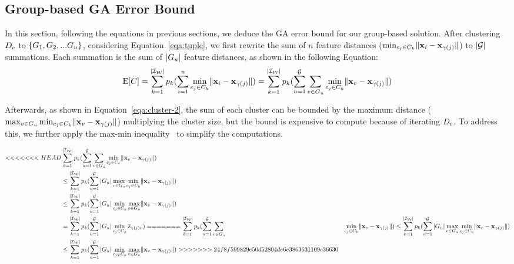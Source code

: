 




\subsection{Group-based GA Error Bound}

In this section, following the equations in previous sections, we deduce the GA error bound for our group-based solution. 
%
After clustering $D_c$ to $\{ G_1 , G_2, ...G_u\}$, considering Equation~\ref{eqa:tuple}, we  first rewrite the sum of $n$ feature distances (\ie $\min_{c_j\in C_k}\lVert\mathbf{x}_i - \mathbf{x}_{\gamma(j)}\rVert$) to   $|\mathcal{G}|$ summations. Each summation is the sum of $|G_u|$ feature distances, as shown in the following Equation:
\vspace{-0.5em}
\begin{equation}\label{eqa:cluster-1}
 \mathrm{E}[C] = \sum_{k= 1}^{|\mathcal{I_W}|} p_k (\sum_{i=1}^n \min_{c_j\in C_k}\lVert\mathbf{x}_i - \mathbf{x}_{\gamma(j)}\rVert) =  \sum_{k= 1}^{|\mathcal{I_W}|} p_k (\sum_{u=1}^{\mathcal{G}}\sum_{v \in G_u} \min_{c_j\in C_k}\lVert\mathbf{x}_v - \mathbf{x}_{\gamma(j)}\rVert)
\end{equation}

Afterwards, as shown in Equation~\ref{eqa:cluster-2},  the sum of each cluster can be bounded by  the maximum distance ($\max_{v \in G_u} \min_{c_j\in C_k}\lVert\mathbf{x}_v - \mathbf{x}_{\gamma(j)}\rVert$)  multiplying the  cluster size, but the bound is expensive to compute because of iterating $D_c$. To address this, we further apply the max-min inequality~\cite{} to simplify the computations. 


\begin{equation}\label{eqa:cluster-2}
\begin{aligned}
<<<<<<< HEAD
&  \sum_{k= 1}^{|\mathcal{I_W}|} p_k (\sum_{u=1}^{\mathcal{G}}\sum_{v \in G_u} \min_{c_j\in C_k}\lVert\mathbf{x}_v - \mathbf{x}_{\gamma(j)}\rVert) \\
& \leq \sum_{k= 1}^{|\mathcal{I_W}|} p_k (\sum_{u=1}^{\mathcal{G}} |G_u| \max_{v \in G_u} \min_{c_j\in C_k}\lVert\mathbf{x}_v - \mathbf{x}_{\gamma(j)}\rVert) \\
&  \leq \sum_{k= 1}^{|\mathcal{I_W}|} p_k (\sum_{u=1}^{\mathcal{G}} |G_u| \min_{c_j\in C_k} \max_{v \in G_u} \lVert\mathbf{x}_v - \mathbf{x}_{\gamma(j)}\rVert) \\
& =  \sum_{k= 1}^{|\mathcal{I_W}|} p_k (\sum_{u=1}^{\mathcal{G}} |G_u| \min_{c_j\in C_k} \overline{s}_{\gamma(j)v})
=======
  \sum_{k= 1}^{|\mathcal{I_W}|} p_k (\sum_{u=1}^{\mathcal{G}}\sum_{v \in G_u} &\min_{c_j\in C_k}\lVert\mathbf{x}_v - \mathbf{x}_{\gamma(j)}\rVert) 
 \leq \sum_{k= 1}^{|\mathcal{I_W}|} p_k (\sum_{u=1}^{\mathcal{G}} |G_u| \max_{v \in G_u} \min_{c_j\in C_k}\lVert\mathbf{x}_v - \mathbf{x}_{\gamma(j)}\rVert) \\
 & \leq \sum_{k= 1}^{|\mathcal{I_W}|} p_k (\sum_{u=1}^{\mathcal{G}} |G_u| \min_{c_j\in C_k} \max_{v \in G_u} \lVert\mathbf{x}_v - \mathbf{x}_{\gamma(j)}\rVert)
>>>>>>> 24f8f599829e50d52804de6e3863631109c36630
\end{aligned}
\end{equation}



